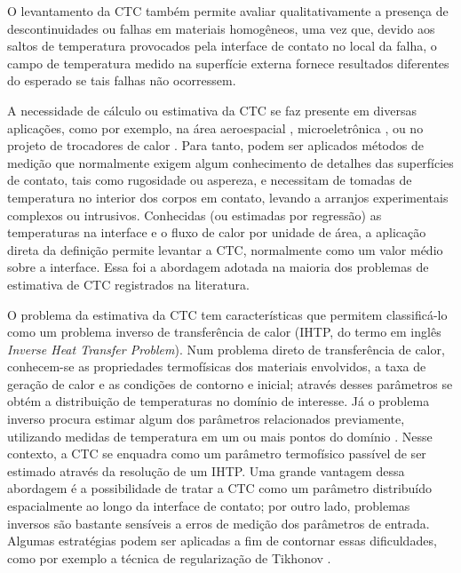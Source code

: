 O levantamento da CTC também permite avaliar qualitativamente a presença de descontinuidades ou falhas
em materiais homogêneos, uma vez que, devido aos saltos de temperatura provocados pela interface de contato no local da falha,
o campo de temperatura medido na superfície externa fornece resultados diferentes do esperado se tais falhas não ocorressem.

A necessidade de cálculo ou estimativa da CTC se faz presente em diversas aplicações, como por exemplo, na área aeroespacial \citep{artigo_aerospacial}, microeletrônica
\citep{artigo_snaith}, ou no projeto de trocadores de calor \citep{artigo_huang}. Para tanto, podem ser aplicados métodos de medição que normalmente exigem
algum conhecimento de detalhes das superfícies de contato, tais como rugosidade ou aspereza, e necessitam de tomadas de temperatura no interior dos corpos em contato, levando a arranjos
experimentais complexos ou intrusivos. Conhecidas (ou estimadas por regressão) as temperaturas na interface e o fluxo de calor por unidade de área, a aplicação
direta da definição permite levantar a CTC, normalmente como um valor médio sobre a interface. Essa foi a abordagem adotada na maioria dos problemas de estimativa
de CTC registrados na literatura.

O problema da estimativa da CTC tem características que permitem classificá-lo como um problema inverso de transferência de calor (IHTP, do termo em inglês
\textit{Inverse Heat Transfer Problem}). Num problema direto de transferência de calor, conhecem-se as propriedades termofísicas dos materiais envolvidos,
a taxa de geração de calor e as
condições de contorno e inicial; através desses parâmetros se obtém a distribuição de temperaturas no domínio de interesse. Já o problema inverso procura
estimar algum dos parâmetros relacionados previamente, utilizando medidas de temperatura em um ou mais pontos do domínio \citep{livro_beck_2}.
Nesse contexto, a CTC se enquadra como um parâmetro termofísico passível de ser estimado através da resolução de um IHTP. Uma grande vantagem dessa
abordagem é a possibilidade de tratar a CTC como um parâmetro distribuído espacialmente ao longo da interface de contato; por outro lado, problemas
inversos são bastante sensíveis a erros de medição dos parâmetros de entrada. Algumas estratégias podem ser aplicadas
a fim de contornar essas dificuldades, como por exemplo a técnica de regularização de Tikhonov \citep{livro_tikonov}.

